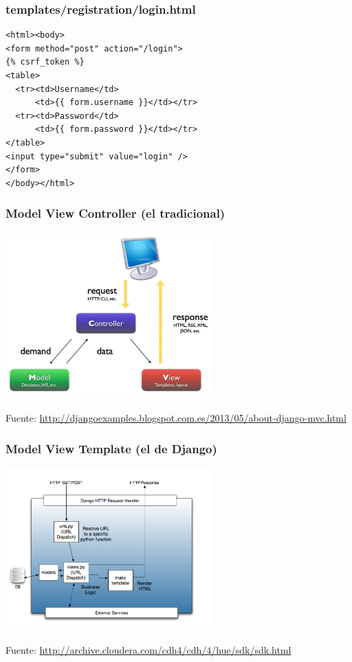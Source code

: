 \begin{frame}[fragile]
\frametitle{templates/registration/login.html}

\begin{verbatim}
<html><body>
<form method="post" action="/login">
{% csrf_token %}
<table>
  <tr><td>Username</td>
      <td>{{ form.username }}</td></tr>
  <tr><td>Password</td>
      <td>{{ form.password }}</td></tr>
</table>
<input type="submit" value="login" />
</form>
</body></html>
\end{verbatim}
\end{frame}




\begin{frame}
\frametitle{Model View Controller (el tradicional)}

\begin{center}
\includegraphics[width=8cm]{figs/mvc.png}
\end{center}

\begin{flushright}
{\footnotesize
Fuente: \url{http://djangoexamples.blogspot.com.es/2013/05/about-django-mvc.html}
}
\end{flushright}
\end{frame}

\begin{frame}
\frametitle{Model View Template (el de Django)}

\begin{center}
\includegraphics[width=8cm]{figs/mvc-mtv-django}
\end{center}

\begin{flushright}
{\footnotesize
Fuente: \url{http://archive.cloudera.com/cdh4/cdh/4/hue/sdk/sdk.html}
}
\end{flushright}
\end{frame}


